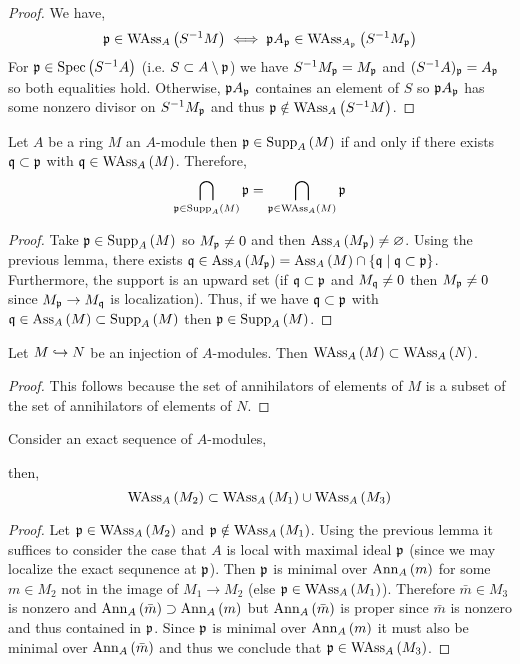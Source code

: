 \documentclass[12pt]{article}
\begin{document}
\begin{proof}
We have,
\[ \p \in \WAss{A}{S^{-1} M} \iff \p A_\p \in \WAss{A_\p}{S^{-1} M_\p}  \]
For $\p \in \Spec{S^{-1} A}$ (i.e. $S \subset A \setminus \p$) we have $S^{-1} M_\p = M_\p$ and $(S^{-1} A)_\p = A_\p$ so both equalities hold. Otherwise, $\p A_\p$ containes an element of $S$ so $\p A_\p$ has some nonzero divisor on $S^{-1} M_\p$ and thus $\p \notin \WAss{A}{S^{-1} M}$. 
\end{proof}


\begin{proposition}
Let $A$ be a ring $M$ an $A$-module then $\p \in \Supp{A}{M}$ if and only if there exists $\q \subset \p$ with $\q \in \WAss{A}{M}$. Therefore, \[ \bigcap_{\p \in \Supp{A}{M}} \p = \bigcap_{\p \in \WAss{A}{M}} \p \]
\end{proposition}

\begin{proof}
Take $\p \in \Supp{A}{M}$ so $M_\p \neq 0$ and then $\Ass{A}{M_\p} \neq \varnothing$. Using the previous lemma, there exists $\q \in \Ass{A}{M_\p} = \Ass{A}{M} \cap \{ \q \mid \q \subset \p \}$. Furthermore, the support is an upward set (if $\q \subset \p$ and $M_\q \neq 0$ then $M_\p \neq 0$ since $M_\p \to M_\q$ is localization). Thus, if we have $\q \subset \p$ with $\q \in \Ass{A}{M} \subset \Supp{A}{M}$ then $\p \in \Supp{A}{M}$.  
\end{proof}


\begin{lemma}
Let $M \embed N$ be an injection of $A$-modules. Then $\WAss{A}{M} \subset \WAss{A}{N}$.
\end{lemma}

\begin{proof}
This follows because the set of annihilators of elements of $M$ is a subset of the set of annihilators of elements of $N$.
\end{proof}

\begin{lemma} \label{exact_seq_weak_ass}
Consider an exact sequence of $A$-modules,
\begin{center}
\end{center}
then,
\[ \WAss{A}{M_2} \subset \WAss{A}{M_1} \cup \WAss{A}{M_3} \]
\end{lemma}

\begin{proof}
Let $\p \in \WAss{A}{M_2}$ and $\p \notin \WAss{A}{M_1}$. Using the previous lemma it suffices to consider the case that $A$ is local with maximal ideal $\p$ (since we may localize the exact sequnence at $\p$). 
Then $\p$ is minimal over $\Ann{A}{m}$ for some $m \in M_2$ not in the image of $M_1 \to M_2$ (else $\p \in \WAss{A}{M_1}$). Therefore $\bar{m} \in M_3$ is nonzero and $\Ann{A}{\bar{m}} \supset \Ann{A}{m}$ but $\Ann{A}{\bar{m}}$ is proper since $\bar{m}$ is nonzero and thus contained in $\p$. Since $\p$ is minimal over $\Ann{A}{m}$ it must also be minimal over $\Ann{A}{\bar{m}}$ and thus we conclude that $\p \in \WAss{A}{M_3}$.
\end{proof}
\end{document}
